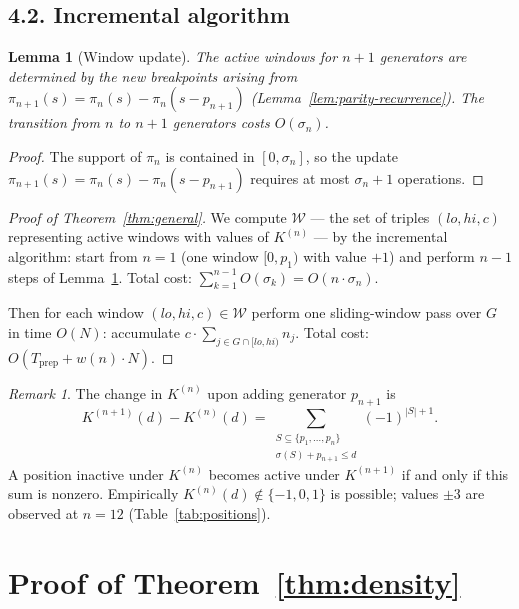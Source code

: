 \documentclass[11pt,a4paper]{amsart}
\theoremstyle{plain}
\newtheorem{lemma}[theorem]{Lemma}
\theoremstyle{definition}
\theoremstyle{remark}
\newtheorem{remark}[theorem]{Remark}
\begin{document}
\subsection*{4.2. Incremental algorithm}

\begin{lemma}[Window update]
\label{lem:incremental}
The active windows for $n+1$ generators are determined by
the new breakpoints arising from $\pi_{n+1}(s) = \pi_n(s) - \pi_n(s - p_{n+1})$
(Lemma~\ref{lem:parity-recurrence}).
The transition from $n$ to $n+1$ generators costs $O(\sigma_n)$.
\end{lemma}

\begin{proof}
The support of $\pi_n$ is contained in $[0, \sigma_n]$, so
the update $\pi_{n+1}(s) = \pi_n(s) - \pi_n(s - p_{n+1})$
requires at most $\sigma_n + 1$ operations.
\end{proof}

\begin{proof}[Proof of Theorem~\ref{thm:general}]
We compute $\mathcal{W}$ --- the set of triples $(lo, hi, c)$
representing active windows with values of $K^{(n)}$ --- by the
incremental algorithm: start from $n = 1$ (one window $[0, p_1)$
with value $+1$) and perform $n-1$ steps of Lemma~\ref{lem:incremental}.
Total cost: $\sum_{k=1}^{n-1} O(\sigma_k) = O(n \cdot \sigma_n)$.

Then for each window $(lo, hi, c) \in \mathcal{W}$
perform one sliding-window pass over $G$ in time $O(N)$:
accumulate $c \cdot \sum_{j \in G \cap [lo, hi)} n_j$.
Total cost: $O(T_{\mathrm{prep}} + w(n) \cdot N)$.
\end{proof}

\begin{remark}
\label{rem:activation}
The change in $K^{(n)}$ upon adding generator $p_{n+1}$ is
\[
  K^{(n+1)}(d) - K^{(n)}(d) =
  \sum_{\substack{S \subseteq \{p_1,\ldots,p_n\} \\ \sigma(S)+p_{n+1} \leq d}}
  (-1)^{|S|+1}.
\]
A position inactive under $K^{(n)}$ becomes active under $K^{(n+1)}$
if and only if this sum is nonzero.
Empirically $K^{(n)}(d) \notin \{-1, 0, 1\}$ is possible;
values $\pm 3$ are observed at $n = 12$
(Table~\ref{tab:positions}).
\end{remark}

\section{Proof of Theorem~\ref{thm:density}}
\label{sec:proof-density}
\end{document}
